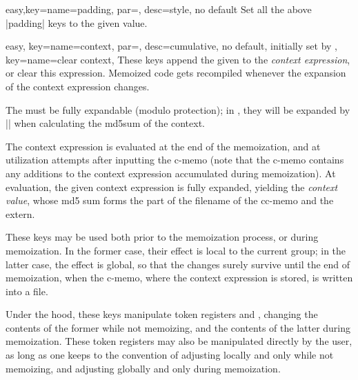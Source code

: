 \documentclass[a4paper,11pt]{article}
\begin{document}
\begin{doc}{easy,key={name=padding, par=, desc={style, no default}}}
  Set all the above |padding| keys to the given value.
\end{doc}

\begin{doc}{
    easy,
    key={name=context, par=, desc={cumulative, no default,
        initially set by }},
    key={name=clear context},
  }
  These keys append the given  to the \emph{context expression},
  or clear this expression.  Memoized code gets recompiled whenever the
  expansion of the context expression changes.

  The  must be fully expandable (modulo protection); in
  , they will be expanded by |\protected@edef| when calculating
  the md5sum of the context.

  The context expression is evaluated at the end of the memoization, and at
  utilization attempts after inputting the c-memo (note that the c-memo
  contains any additions to the context expression accumulated during
  memoization).  At evaluation, the given context expression is fully expanded,
  yielding the \emph{context value}, whose md5 sum forms the  part of the filename of the cc-memo and the extern.

  These keys may be used both prior to the memoization process, or during
  memoization.  In the former case, their effect is local to the current group;
  in the latter case, the effect is global, so that the changes surely survive
  until the end of memoization, when the c-memo, where the context expression
  is stored, is written into a file.

  Under the hood, these keys manipulate token registers
   and , changing the
  contents of the former while not memoizing, and the contents of the latter
  during memoization.  These token registers may also be manipulated directly
  by the user, as long as one keeps to the convention of adjusting
   locally and only while not memoizing, and adjusting
   globally and only during memoization.
\end{doc}
\end{document}
